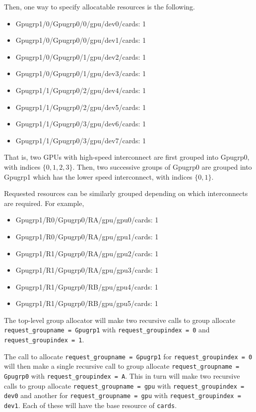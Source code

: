 \documentclass[12pt,onecolumn]{IEEEtran}
\newcommand{\bus}{\_\allowbreak}
\begin{document}
Then, one way to specify allocatable resources is the following.
\ttfamily
\begin{itemize}
\item[] Gpugrp1/0/Gpugrp0/0/gpu/dev0/cards: 1
\item[] Gpugrp1/0/Gpugrp0/0/gpu/dev1/cards: 1
\item[] Gpugrp1/0/Gpugrp0/1/gpu/dev2/cards: 1
\item[] Gpugrp1/0/Gpugrp0/1/gpu/dev3/cards: 1
\item[] Gpugrp1/1/Gpugrp0/2/gpu/dev4/cards: 1
\item[] Gpugrp1/1/Gpugrp0/2/gpu/dev5/cards: 1
\item[] Gpugrp1/1/Gpugrp0/3/gpu/dev6/cards: 1
\item[] Gpugrp1/1/Gpugrp0/3/gpu/dev7/cards: 1
\end{itemize}
\normalfont
That is, two GPUs with high-speed interconnect 
are first grouped into Gpugrp0, with indices $\{0,1,2,3\}$.
Then, two successive groups of Gpugrp0 are grouped into Gpugrp1
which has the lower speed interconnect, with indices $\{0, 1\}$.

Requested resources can be similarly grouped depending on
which interconnects are required.
For example,
\ttfamily
\begin{itemize}
\item[] Gpugrp1/R0/Gpugrp0/RA/gpu/gpu0/cards: 1
\item[] Gpugrp1/R0/Gpugrp0/RA/gpu/gpu1/cards: 1
\item[] Gpugrp1/R1/Gpugrp0/RA/gpu/gpu2/cards: 1
\item[] Gpugrp1/R1/Gpugrp0/RA/gpu/gpu3/cards: 1
\item[] Gpugrp1/R1/Gpugrp0/RB/gpu/gpu4/cards: 1
\item[] Gpugrp1/R1/Gpugrp0/RB/gpu/gpu5/cards: 1
\end{itemize}
\normalfont
The top-level group allocator will make two recursive
calls to group allocate \texttt{request{\bus}groupname = Gpugrp1} with
\texttt{request{\bus}groupindex = 0} and
\texttt{request{\bus}groupindex = 1}.

The call to allocate \texttt{request{\bus}groupname = Gpugrp1} for
\texttt{request{\bus}groupindex = 0} will then
make a single recursive call to group allocate
\texttt{request{\bus}groupname = Gpugrp0} with
\texttt{request{\bus}groupindex = A}.
This in turn will make two recursive calls to group allocate
\texttt{request{\bus}groupname = gpu} with 
\texttt{request{\bus}groupindex = dev0} and another
for 
\texttt{request{\bus}groupname = gpu} with 
\texttt{request{\bus}groupindex = dev1}.
Each of these will have the base resource of \texttt{cards}.
\end{document}
